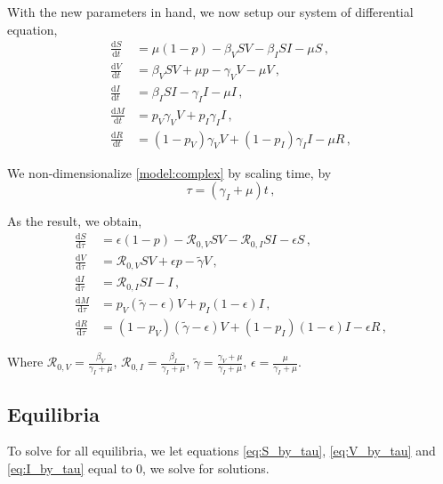 \documentclass[12pt]{article}
\newcommand\dbyd[2]{\frac{\mathrm d{#1}}{\mathrm d{#2}}}
\newcommand{\R}{\mathcal{R}}
\newcommand{\pmV}{p_{V}}
\newcommand{\pmI}{p_{I}}
\begin{document}
With the new parameters in hand, we now setup our system of differential equation,
\begin{equation}\label{model:complex}
\begin{split}
\dbyd{S}{t}&=\mu(1-p)- \beta_V SV -\beta_I SI-\mu S \,,\\
\dbyd{V}{t}&=\beta_V SV+\mu p-\gamma_V V -\mu V\,,\\
\dbyd{I}{t}&=\beta_I SI-\gamma_I I -\mu I\,,\\
\dbyd{M}{t}&=\pmV\gamma_V V+\pmI\gamma_I I\,,\\
\dbyd{R}{t}&=(1-\pmV)\gamma_V V+(1-\pmI)\gamma_I I-\mu R\,,
\end{split}
\end{equation}

We non-dimensionalize \autoref{model:complex} by scaling time, by
\begin{equation}
\tau=(\gamma_I+\mu)t \,,
\end{equation}

As the result, we obtain,
\begin{subequations}\label{eq:base_ODE}
\begin{align}
\dbyd{S}{\tau}&=\epsilon(1-p)-\R_{0,V} SV-\R_{0,I} SI-\epsilon S\,, \label{eq:S_by_tau}\\
\dbyd{V}{\tau}&=\R_{0,V} SV+\epsilon p-\tilde{\gamma} V\,, \label{eq:V_by_tau}\\
\dbyd{I}{\tau}&=\R_{0,I} SI-I\,, \label{eq:I_by_tau}\\
\dbyd{M}{\tau}&=\pmV(\tilde{\gamma}-\epsilon) V+\pmI(1-\epsilon) I\,,\\
\dbyd{R}{\tau}&=(1-\pmV)(\tilde{\gamma}-\epsilon) V+(1-\pmI)(1-\epsilon) I-\epsilon R\,,
\end{align}
\end{subequations}

Where $\R_{0,V}=\frac{\beta_V}{\gamma_I+\mu}$, $\R_{0,I}=\frac{\beta_I}{\gamma_I+\mu}$, $\tilde{\gamma}=\frac{\gamma_V+\mu}{\gamma_I+\mu}$, $\epsilon=\frac{\mu}{\gamma_I+\mu}$.

\subsection{Equilibria}

To solve for all equilibria, we let equations \autoref{eq:S_by_tau}, \autoref{eq:V_by_tau} and \autoref{eq:I_by_tau} equal to 0, we solve for solutions.
\end{document}
